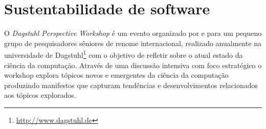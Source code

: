 
\section{Sustentabilidade de software} \label{sustentabilidade}

O {\it Dagstuhl Perspective Workshop} é um evento organizado por e para um
pequeno grupo de pesquisadores sêniores de renome internacional, realizado
anualmente na universidade de Dagstuhl\footnote{\url{http://www.dagstuhl.de}}
com o objetivo de refletir sobre o atual estado da ciência da computação.
Através de uma discussão intensiva com foco estratégico o workshop explora
tópicos novos e emergentes da ciência da computação produzindo manifestos que
capturam tendências e desenvolvimentos relacionados aos tópicos explorados.

%


